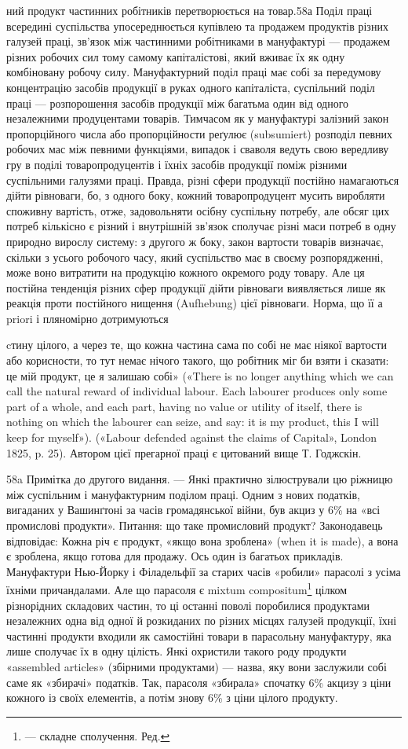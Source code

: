 ний продукт частинних робітників перетворюється на товар.58а
Поділ праці всередині суспільства упосереднюється купівлею та
продажем продуктів різних галузей праці, зв’язок між частинними
робітниками в мануфактурі — продажем різних робочих
сил тому самому капіталістові, який вживає їх як одну комбіновану
робочу силу. Мануфактурний поділ праці має собі за передумову
концентрацію засобів продукції в руках одного капіталіста,
суспільний поділ праці — розпорошення засобів продукції
між багатьма один від одного незалежними продуцентами товарів.
Тимчасом як у мануфактурі залізний закон пропорційного числа
або пропорційности реґулює (subsumiert) розподіл певних робочих
мас між певними функціями, випадок і сваволя ведуть свою
вередливу гру в поділі товаропродуцентів і їхніх засобів продукції
поміж різними суспільними галузями праці. Правда, різні сфери
продукції постійно намагаються дійти рівноваги, бо, з одного
боку, кожний товаропродуцент мусить виробляти споживну вартість,
отже, задовольняти осібну суспільну потребу, але обсяг
цих потреб кількісно є різний і внутрішній зв’язок сполучає
різні маси потреб в одну природно вирослу систему: з другого ж
боку, закон вартости товарів визначає, скільки з усього робочого
часу, який суспільство має в своєму розпорядженні, може воно
витратити на продукцію кожного окремого роду товару. Але ця
постійна тенденція різних сфер продукції дійти рівноваги виявляється
лише як реакція проти постійного нищення (Aufhebung)
цієї рівноваги. Норма, що її а priori і пляномірно дотримуються

cтину цілого, а через те, що кожна частина сама по собі не має ніякої
вартости або корисности, то тут немає нічого такого, що робітник міг би
взяти і сказати: це мій продукт, це я залишаю собі» («There is no longer
anything which we can call the natural reward of individual labour.
Each labourer produces only some part of a whole, and each part, having no
value or utility of itself, there is nothing on which the labourer can seize,
and say: it is my product, this I will keep for myself»). («Labour defended
against the claims of Capital», London 1825, p. 25). Автором цієї
прегарної праці є цитований вище Т. Годжскін.

58a Примітка до другого видання. — Янкі практично зілюстрували
цю ріжницю між суспільним і мануфактурним поділом праці. Одним
з нових податків, вигаданих у Вашинґтоні за часів громадянської війни,
був акциз у 6\% на «всі промислові продукти». Питання: що таке промисловий
продукт? Законодавець відповідає: Кожна річ є продукт,
«якщо вона зроблена» (when it is made), а вона є зроблена, якщо готова
для продажу. Ось один із багатьох прикладів. Мануфактури Нью-Йорку
і Філадельфії за старих часів «робили» парасолі з усіма їхніми причандалами.
Але що парасоля є mixtum compositum\footnote*{
— складне сполучення. Ред.
} цілком різнорідних
складових частин, то ці останні поволі поробилися продуктами незалежних
одна від одної й розкиданих по різних місцях галузей продукції,
їхні частинні продукти входили як самостійні товари в парасольну
мануфактуру, яка лише сполучає їх в одну цілість. Янкі охристили такого
роду продукти «assembled articles» (збірними продуктами) — назва,
яку вони заслужили собі саме як «збирачі» податків. Так, парасоля «збирала»
спочатку 6\% акцизу з ціни кожного із своїх елементів, а потім
знову 6\% з ціни цілого продукту.